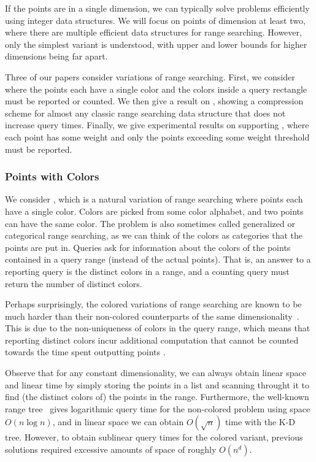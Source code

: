 If the points are in a single dimension, we can typically solve problems efficiently using integer data structures. We will focus on points of dimension at least two, where there are multiple efficient data structures for range searching. However, only the simplest variant is understood, with upper and lower bounds for higher dimensions being far apart.

Three of our papers consider variations of range searching. First, we consider  where the points each have a single color and the colors inside a query rectangle must be reported or counted. We then give a result on , showing a compression scheme for almost any classic range searching data structure that does not increase query times. Finally, we give experimental results on supporting , where each point has some weight and only the points exceeding some weight threshold must be reported. 


\clearpage
\subsubsection{Points with Colors}
We consider , which is a natural variation of range searching where points each have a single color. Colors are picked from some color alphabet, and two points can have the same color. The problem is also sometimes called generalized or categorical range searching, as we can think of the colors as categories that the points are put in. Queries ask for information about the colors of the points contained in a query range (instead of the actual points). That is, an answer to a reporting query is the distinct colors in a range, and a counting query must return the number of distinct colors.

Perhaps surprisingly, the colored variations of range searching are known to be much harder than their non-colored counterparts of the same dimensionality~. This is due to the non-uniqueness of colors in the query range, which means that reporting distinct colors incur additional computation that cannot be counted towards the time spent outputting points . 


Observe that for any constant dimensionality, we can always obtain linear space and linear time by simply storing the points in a list and scanning throught it to find (the distinct colors of) the points in the range. 
Furthermore, the well-known range tree~ gives logarithmic query time for the non-colored problem using space $O(n \log n)$, and in linear space we can obtain $O(\sqrt{n})$ time with the K-D tree. 
However, to obtain sublinear query times for the colored variant, previous solutions required excessive amounts of space of roughly $O(n^d)$. 


